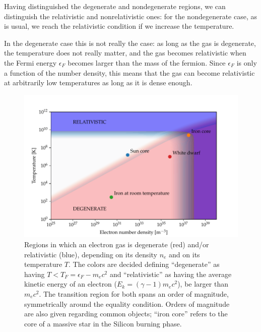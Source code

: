 \documentclass[main.tex]{subfiles}
\begin{document}
Having distinguished the degenerate and nondegenerate regions, we can distinguish the relativistic and nonrelativistic ones: for the nondegenerate case, as is usual, we reach the relativistic condition if we increase the temperature. 

In the degenerate case this is not really the case: as long as the gas is degenerate, the temperature does not really matter, and the gas becomes relativistic when the Fermi energy \(\epsilon _F\) becomes larger than the mass of the fermion.
Since \(\epsilon _F\) is only a function of the number density, this means that the gas can become relativistic at arbitrarily low temperatures as long as it is dense enough.

\begin{figure}[ht]
\centering
\includegraphics[width=\textwidth]{figures/relativisticity_degeneracy.pdf}
\caption{Regions in which an electron gas is degenerate (red) and/or relativistic (blue), depending on its density \(n_e\) and on its temperature \(T\). The colors are decided defining ``degenerate'' as having \(T < T_F = \epsilon _F - m_e c^2\) and ``relativistic'' as having the average kinetic energy of an electron (\(E_k = (\gamma - 1) m_e c^2\)), be larger than \(m_e c^2\). The transition region for both spans an order of magnitude, symmetrically around the equality condition.
Orders of magnitude are also given regarding common objects; ``iron core'' refers to the core of a massive star in the Silicon burning phase.}
\label{fig:relativisticity_degeneracy}
\end{figure}
\end{document}
